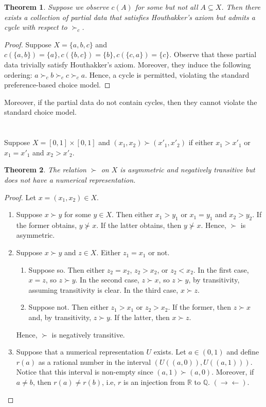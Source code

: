\documentclass[12pt]{article}
\newtheorem{thm}{Theorem}[section]
\theoremstyle{definition}
\theoremstyle{remark}
\def\RR{\mathbb{R}}
\def\QQ{\mathbb{Q}}
\def\contra{\rightarrow \leftarrow}
\begin{document}
\begin{thm}
  Suppose we observe $c(A)$ for some but not all $A \subseteq X$. Then there exists a collection of partial data that satisfies Houthakker's axiom but admits a cycle with respect to $\succ_c$.
\end{thm}
\begin{proof}
  Suppose $X = \{ a, b, c \}$ and $c(\{ a, b \}) = \{ a \}, c(\{ b, c \}) = \{ b \}, c(\{ c, a \}) = \{ c \}$. Observe that these partial data trivially satisfy Houthakker's axiom. Moreover, they induce the following ordering: $a \succ_c b \succ_c c \succ_c a$. Hence, a cycle is permitted, violating the standard preference-based choice model.
\end{proof}
\noindent Moreover, if the partial data do not contain cycles, then they cannot violate the standard choice model.
%
%
\section{}
Suppose $X = [0,1] \times [0,1]$ and $(x_1, x_2) \succ (x'_1, x'_2)$ if either $x_1 > x'_1$ or $x_1 = x'_1$ and $x_2 > x'_2$.
\begin{thm}
  The relation $\succ$ on $X$ is asymmetric and negatively transitive but does not have a numerical representation.
\end{thm}
\begin{proof} Let $x = (x_1, x_2) \in X$.
  \begin{enumerate}
    \item Suppose $x \succ y$ for some $y \in X$. Then either $x_1 > y_1$ or $x_1 = y_1$ and $x_2 > y_2$. If the former obtains, $y \not \succ x$. If the latter obtains, then $y \not \succ x$. Hence, $\succ$ is asymmetric.
    \item Suppose $x \succ y$ and $z \in X$. Either $z_1 = x_1$ or not.
    \begin{enumerate}
      \item Suppose so. Then either $z_2 = x_2$, $z_2 > x_2$, or $z_2 < x_2$. In the first case, $x = z$, so $z \succ y$. In the second case, $z \succ x$, so $z \succ y$, by transitivity, assuming transitivity is clear. In the third case, $x \succ z$.
      \item Suppose not. Then either $z_1 > x_1$ or $z_2 > x_2$. If the former, then $z \succ x$ and, by transitivity, $z \succ y$. If the latter, then $x \succ z$.
    \end{enumerate}
    Hence, $\succ$ is negatively transitive.
    \item Suppose that a numerical representation $U$ exists. Let $a \in (0,1)$ and define $r(a)$ as a rational number in the interval $(U((a, 0)), U((a, 1)))$. Notice that this interval is non-empty since $(a, 1) \succ (a, 0)$. Moreover, if $a \neq b$, then $r(a) \neq r(b)$, i.e, $r$ is an injection from $\RR$ to $\QQ$. $(\contra)$.
  \end{enumerate}
\end{proof}
%
%
\end{document}

